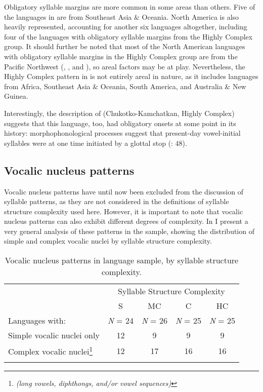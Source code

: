   Obligatory syllable margins are more common in some areas than others. Five of the languages in  are from Southeast Asia \& Oceania. North America is also heavily represented, accounting for another six languages altogether, including four of the languages with obligatory syllable margins from the Highly Complex group. It should further be noted that most of the North American languages with obligatory syllable margins in the Highly Complex group are from the Pacific Northwest (, , and ), so areal factors may be at play. Nevertheless, the Highly Complex pattern in  is not entirely areal in nature, as it includes languages from Africa, Southeast Asia \& Oceania, South America, and Australia \& New Guinea. 

  Interestingly, the description of  (Chukotko-Kamchatkan, Highly Complex) suggests that this language, too, had obligatory onsets at some point in its history: morphophonological processes suggest that present-day vowel-initial syllables were at one time initiated by a glottal stop (\citealt{GeorgVolodin1999}: 48).

\subsection{Vocalic nucleus patterns}\label{sec:3.3.4}

  Vocalic nucleus patterns have until now been excluded from the discussion of syllable patterns, as they are not considered in the definitions of syllable structure complexity used here. However, it is important to note that vocalic nucleus patterns can also exhibit different degrees of complexity. In  I present a very general analysis of these patterns in the sample, showing the distribution of simple and complex vocalic nuclei by syllable structure complexity.

\begin{table}
\begin{tabular}{lcccc}
\lsptoprule
 & \multicolumn{4}{c}{Syllable Structure Complexity}\\\cmidrule(lr){2-5}
  & S & MC & C & HC\\
  Languages with:     & \textit{N} = 24 & \textit{N} = 26 & \textit{N} = 25 & \textit{N} = 25\\\midrule
 Simple vocalic nuclei only & 12 & \phantom{1}9 & \phantom{1}9 & \phantom{1}9\\
 Complex vocalic nuclei\footnote{\textit{(long vowels, diphthongs, and\slash or vowel sequences)}} & 12 & 17 & 16 & 16\\
\lspbottomrule
\end{tabular}
\caption{\label{tab:3.5}Vocalic nucleus patterns in language sample, by syllable structure complexity.}
\end{table}

